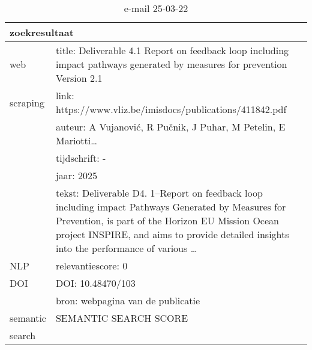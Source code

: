 \begin{table}[h!]
    \caption{e-mail 25-03-22}
    \centering
    \begin{tabularx}{\textwidth}{|p{4cm}|X|} 
        \hline
        \multicolumn{2}{|X|}{\textbf{zoekresultaat}} \\
        \hline
        web &title: Deliverable 4.1 Report on feedback loop including impact pathways generated by measures for prevention Version 2.1\\
        scraping&link: https://www.vliz.be/imisdocs/publications/411842.pdf\\
        &auteur: A Vujanović, R Pučnik, J Puhar, M Petelin, E Mariotti…\\
        &tijdschrift: -\\
        &jaar: 2025\\
        &tekst: Deliverable D4. 1–Report on feedback loop including impact Pathways Generated by Measures for Prevention, is part of the Horizon EU Mission Ocean project INSPIRE, and aims to provide detailed insights into the performance of various …\\
        \hline
        NLP&relevantiescore: 0\\
        \hline
        DOI&DOI: 10.48470/103\\
        &bron: webpagina van de publicatie\\
        \hline
        semantic&SEMANTIC SEARCH SCORE\\
        search&\\
        \hline
    \end{tabularx}
    \label{table:email20250322}
\end{table}

